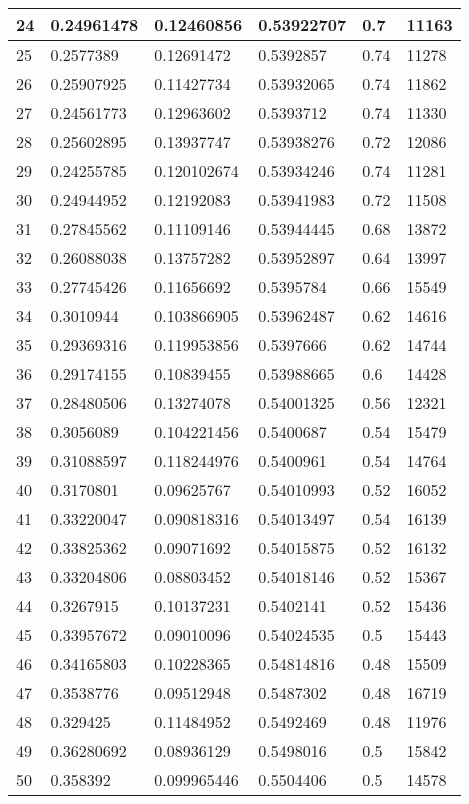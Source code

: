 \begin{longtable}{|l|l|l|l|l|l|}
24 & 0.24961478 & 0.12460856 & 0.53922707 & 0.7 & 11163 \\ \hline 
25 & 0.2577389 & 0.12691472 & 0.5392857 & 0.74 & 11278 \\ \hline 
26 & 0.25907925 & 0.11427734 & 0.53932065 & 0.74 & 11862 \\ \hline 
27 & 0.24561773 & 0.12963602 & 0.5393712 & 0.74 & 11330 \\ \hline 
28 & 0.25602895 & 0.13937747 & 0.53938276 & 0.72 & 12086 \\ \hline 
29 & 0.24255785 & 0.120102674 & 0.53934246 & 0.74 & 11281 \\ \hline 
30 & 0.24944952 & 0.12192083 & 0.53941983 & 0.72 & 11508 \\ \hline 
31 & 0.27845562 & 0.11109146 & 0.53944445 & 0.68 & 13872 \\ \hline 
32 & 0.26088038 & 0.13757282 & 0.53952897 & 0.64 & 13997 \\ \hline 
33 & 0.27745426 & 0.11656692 & 0.5395784 & 0.66 & 15549 \\ \hline 
34 & 0.3010944 & 0.103866905 & 0.53962487 & 0.62 & 14616 \\ \hline 
35 & 0.29369316 & 0.119953856 & 0.5397666 & 0.62 & 14744 \\ \hline 
36 & 0.29174155 & 0.10839455 & 0.53988665 & 0.6 & 14428 \\ \hline 
37 & 0.28480506 & 0.13274078 & 0.54001325 & 0.56 & 12321 \\ \hline 
38 & 0.3056089 & 0.104221456 & 0.5400687 & 0.54 & 15479 \\ \hline 
39 & 0.31088597 & 0.118244976 & 0.5400961 & 0.54 & 14764 \\ \hline 
40 & 0.3170801 & 0.09625767 & 0.54010993 & 0.52 & 16052 \\ \hline 
41 & 0.33220047 & 0.090818316 & 0.54013497 & 0.54 & 16139 \\ \hline 
42 & 0.33825362 & 0.09071692 & 0.54015875 & 0.52 & 16132 \\ \hline 
43 & 0.33204806 & 0.08803452 & 0.54018146 & 0.52 & 15367 \\ \hline 
44 & 0.3267915 & 0.10137231 & 0.5402141 & 0.52 & 15436 \\ \hline 
45 & 0.33957672 & 0.09010096 & 0.54024535 & 0.5 & 15443 \\ \hline 
46 & 0.34165803 & 0.10228365 & 0.54814816 & 0.48 & 15509 \\ \hline 
47 & 0.3538776 & 0.09512948 & 0.5487302 & 0.48 & 16719 \\ \hline 
48 & 0.329425 & 0.11484952 & 0.5492469 & 0.48 & 11976 \\ \hline 
49 & 0.36280692 & 0.08936129 & 0.5498016 & 0.5 & 15842 \\ \hline 
50 & 0.358392 & 0.099965446 & 0.5504406 & 0.5 & 14578 \\ \hline 
\end{longtable}